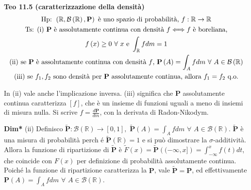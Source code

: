 \documentclass{article}
\begin{document}
\textbf{Teo 11.5 (caratterizzazione della densit\`{a})}%
\begin{gather*}
\text{Hp: }\left( 
\mathbb{R}
,\mathcal{B}\left( 
\mathbb{R}
\right) ,\mathbf{P}\right) \text{ \`{e} uno spazio di probabilit\`{a}, }f:%
\mathbb{R}
\rightarrow 
\mathbb{R}
\\
\text{Ts: (i) }\mathbf{P}\text{ \`{e} assolutamente continua con densit\`{a} 
}f\Longleftrightarrow f\text{ \`{e} boreliana,} \\
f\left( x\right) \geq 0\text{ }\forall \text{ }x\text{ e }\int_{%
\mathbb{R}
}fdm=1 \\
\text{(ii) se }\mathbf{P}\text{ \`{e} assolutamente continua con densit\`{a} 
}f\text{, }\mathbf{P}\left( A\right) =\int_{A}fdm\text{ }\forall \text{ }%
A\in \mathcal{B}\left( 
\mathbb{R}
\right) \\
\text{(iii) se }f_{1},f_{2}\text{ sono densit\`{a} per }\mathbf{P}\text{
assolutamente continua, allora }f_{1}=f_{2}\text{ q.o.}
\end{gather*}

In (ii) vale anche l'implicazione inversa. (iii) significa che $\mathbf{P}$ assolutamente
continua caratterizza $\left[ f\right] $, che \`{e} un insieme di funzioni
uguali a meno di insiemi di misura nulla. Si scrive $f=\frac{d\mathbf{P}}{dm}
$, con la derivata di Radon-Nikodym.

\textbf{Dim*}
(ii) Definisco $\mathbf{\tilde{P}}:\mathcal{B}\left( 
\mathbb{R}
\right) \rightarrow \left[ 0,1\right] ,$ $\mathbf{\tilde{P}}\left( A\right)
=\int_{A}fdm$ $\forall $ $A\in \mathcal{B}\left( 
\mathbb{R}
\right) $. $\mathbf{\tilde{P}}$ \`{e} una misura di probabilit\`{a} perch%
\'{e} $\mathbf{\tilde{P}}\left( 
\mathbb{R}
\right) =1$ e si pu\`{o} dimostrare la $\sigma $-additivit\`{a}. Allora la
funzione di ripartizione di $\mathbf{\tilde{P}}$ \`{e} $\tilde{F}\left(
x\right) =\mathbf{\tilde{P}}\left( (-\infty ,x]\right) =\int_{-\infty
}^{x}f\left( t\right) dt$, che coincide con $F\left( x\right) $ per
definizione di probabilit\`{a} assolutamente continua. Poich\'{e} la
funzione di ripartizione caratterizza la $\mathbf{P}$, vale $\mathbf{\tilde{P%
}=P}$, ed effettivamente $\mathbf{P}\left( A\right) =\int_{A}fdm$ $\forall $ 
$A\in \mathcal{B}\left( 
\mathbb{R}
\right) $.
\end{document}

